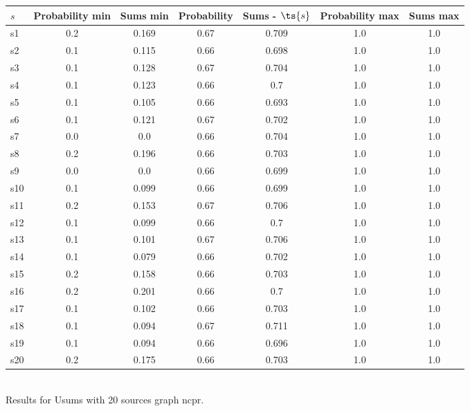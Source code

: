 \documentclass{article}
\begin{document}
\noindent\begin{tabular}{|l|c|c|c|c|c|c|}
\hline
$s$& Probability min & Sums min & Probability & Sums - $\ts{s}$ & Probability max & Sums max\\
\hline
s1 &0.2 & 0.169 & 0.67 & 0.709 & 1.0 & 1.0\\
\hline
s2 &0.1 & 0.115 & 0.66 & 0.698 & 1.0 & 1.0\\
\hline
s3 &0.1 & 0.128 & 0.67 & 0.704 & 1.0 & 1.0\\
\hline
s4 &0.1 & 0.123 & 0.66 & 0.7 & 1.0 & 1.0\\
\hline
s5 &0.1 & 0.105 & 0.66 & 0.693 & 1.0 & 1.0\\
\hline
s6 &0.1 & 0.121 & 0.67 & 0.702 & 1.0 & 1.0\\
\hline
s7 &0.0 & 0.0 & 0.66 & 0.704 & 1.0 & 1.0\\
\hline
s8 &0.2 & 0.196 & 0.66 & 0.703 & 1.0 & 1.0\\
\hline
s9 &0.0 & 0.0 & 0.66 & 0.699 & 1.0 & 1.0\\
\hline
s10 &0.1 & 0.099 & 0.66 & 0.699 & 1.0 & 1.0\\
\hline
s11 &0.2 & 0.153 & 0.67 & 0.706 & 1.0 & 1.0\\
\hline
s12 &0.1 & 0.099 & 0.66 & 0.7 & 1.0 & 1.0\\
\hline
s13 &0.1 & 0.101 & 0.67 & 0.706 & 1.0 & 1.0\\
\hline
s14 &0.1 & 0.079 & 0.66 & 0.702 & 1.0 & 1.0\\
\hline
s15 &0.2 & 0.158 & 0.66 & 0.703 & 1.0 & 1.0\\
\hline
s16 &0.2 & 0.201 & 0.66 & 0.7 & 1.0 & 1.0\\
\hline
s17 &0.1 & 0.102 & 0.66 & 0.703 & 1.0 & 1.0\\
\hline
s18 &0.1 & 0.094 & 0.67 & 0.711 & 1.0 & 1.0\\
\hline
s19 &0.1 & 0.094 & 0.66 & 0.696 & 1.0 & 1.0\\
\hline
s20 &0.2 & 0.175 & 0.66 & 0.703 & 1.0 & 1.0\\
\hline
\end{tabular}\\

\noindent Results for Usums with 20 sources graph ncpr.
\end{document}
